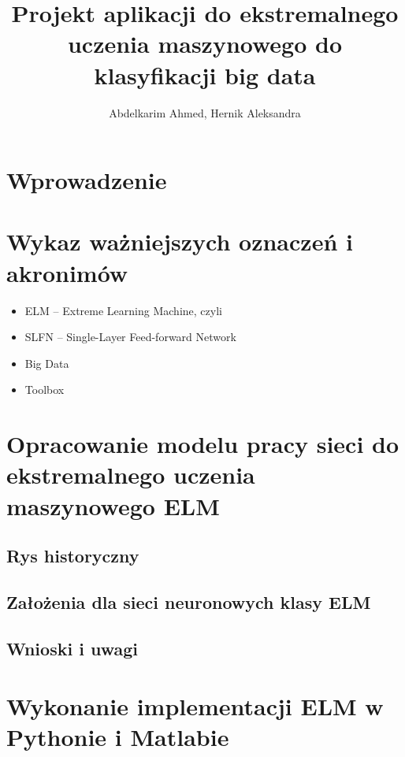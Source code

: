 \documentclass{article}
\title{Projekt aplikacji do ekstremalnego uczenia maszynowego do klasyfikacji big data}
\author{Abdelkarim Ahmed, Hernik Aleksandra}
\date{}
\begin{document}
\clearpage
\vspace*{\fill}
\begin{center}
\begin{minipage}{.9\textwidth}
\maketitle
\end{minipage}
\end{center}
\vfill %
\clearpage

\tableofcontents

\section*{Wprowadzenie}
\section*{Wykaz ważniejszych oznaczeń i akronimów}
\begin{itemize}
\item ELM -- Extreme Learning Machine, czyli 
\item SLFN -- Single-Layer Feed-forward Network 
\item Big Data
\item Toolbox
\end{itemize}
\section{Opracowanie modelu pracy sieci do ekstremalnego uczenia maszynowego ELM}
\subsection{Rys historyczny}
\subsection{Założenia dla sieci neuronowych klasy ELM}
\subsection{Wnioski i uwagi}
\section{Wykonanie implementacji ELM w Pythonie i Matlabie}
\end{document}
